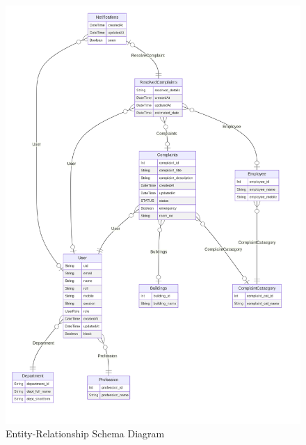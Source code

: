 \documentclass[a4paper,12pt]{article}
\begin{document}
\begin{figure}[H]
    \centering
    \includegraphics[width=1\linewidth]{photos/er-schema.png}
    \caption{Entity-Relationship Schema Diagram}
    \label{fig:enter-label}
\end{figure}
\end{document}
